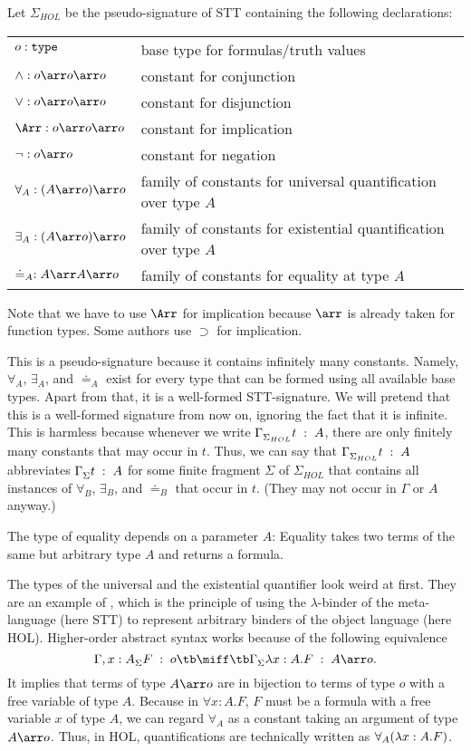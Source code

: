 Let $\Sigma_{HOL}$ be the pseudo-signature of STT containing the following declarations:

\begin{center}
\begin{tabular}{|l|l|}
 \hline
	$o:\mathtt{type}$               & base type for formulas/truth values \\
	$\wedge:o\arr o\arr o$  & constant for conjunction \\
	$\vee:o\arr o\arr o$    & constant for disjunction \\
	$\impl:o\arr o\arr o$   & constant for implication \\
  $\neg:o\arr o$          & constant for negation \\
  $\forall_A:(A\arr o)\arr o$ & family of constants for universal quantification over type $A$ \\
  $\exists_A:(A\arr o)\arr o$ & family of constants for existential quantification over type $A$ \\
  $\doteq_A:  A\arr A\arr o$  & family of constants for equality at type $A$ \\
 \hline
\end{tabular}
\end{center}
Note that we have to use $\impl$ for implication because $\arr$ is already taken for function types. Some authors use $\supset$ for implication.

This is a pseudo-signature because it contains infinitely many constants. Namely, $\forall_A$, $\exists_A$, and $\doteq_A$ exist for every type that can be formed using all available base types. Apart from that, it is a well-formed STT-signature. We will pretend that this is a well-formed signature from now on, ignoring the fact that it is infinite. This is harmless because whenever we write $\Gamma^{}_{\Sigma_{HOL}}t\;:\;A$, there are only finitely many constants that may occur in $t$. Thus, we can say that $\Gamma^{}_{\Sigma_{HOL}}t\;:\;A$ abbreviates $\Gamma^{}_{\Sigma}t\;:\;A$ for some finite fragment $\Sigma$ of $\Sigma_{HOL}$ that contains all instances of $\forall_B$, $\exists_B$, and $\doteq_B$ that occur in $t$. (They may not occur in $\Gamma$ or $A$ anyway.)

The type of equality depends on a parameter $A$: Equality takes two terms of the same but arbitrary type $A$ and returns a formula.
\medskip

The types of the universal and the existential quantifier look weird at first. They are an example of , which is the principle of using the $\lambda$-binder of the meta-language (here STT) to represent arbitrary binders of the object language (here HOL). Higher-order abstract syntax works because of the following equivalence
 \[\oftype{\Sigma}{\Gamma,x:A}{F}{o}  \tb\miff\tb \oftype{\Sigma}{\Gamma}{\lam{x}{A}F}{A\arr o}.\]
It implies that terms of type $A\arr o$ are in bijection to terms of type $o$ with a free variable of type $A$.
Because in $\forall x:A.F$, $F$ must be a formula with a free variable $x$ of type $A$, we can regard $\forall_A$ as a constant taking an argument of type $A\arr o$. Thus, in HOL, quantifications are technically written as $\forall_A(\lambda x:A.F)$.

